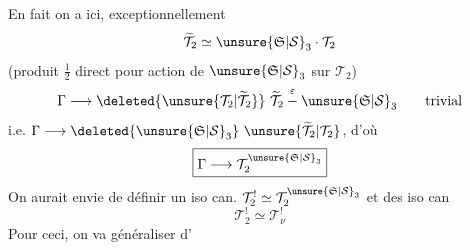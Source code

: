 En fait on a ici, exceptionnellement
\[
\widetilde{\mathcal T}_2\simeq\unsure{\mathfrak S|\mathcal S}_3\cdot\mathcal T_2
\]
(produit $\tfrac12$ direct pour action de $\unsure{\mathfrak S|\mathcal S}_3$ sur $\mathcal T_2$)
\[
\Gamma\longrightarrow\deleted{\unsure{\mathcal T_2|\widetilde{\mathcal T}_2}}\ \widetilde{\mathcal T}_2
\overset{\varepsilon}{-}\unsure{\mathfrak S|\mathcal S}_3\qquad\text{trivial}
\]
i.e. $\Gamma\longrightarrow\deleted{\unsure{\mathfrak S|\mathcal S}_3}\ \unsure{\widetilde{\mathcal T}_2|\mathcal T_2}$, d'où
\[
\boxed{\Gamma\longrightarrow\mathcal T_2^{\unsure{\mathfrak S|\mathcal S}_3}}
\]
On aurait envie de définir un
iso can. $\mathcal T_2^!\simeq\mathcal T_2^{\unsure{\mathfrak S|\mathcal S}_3}$
et des iso can
\[
\mathcal T_2^!\simeq\mathcal T_\nu^!
\]
Pour ceci, on va généraliser d'
